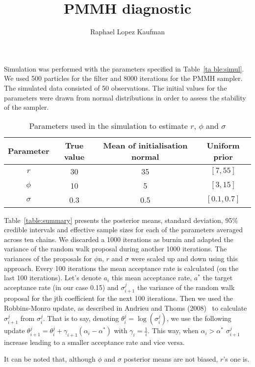 \documentclass{article}
\title{PMMH diagnostic}
\author{Raphael Lopez Kaufman}
\date{}
\begin{document}
Simulation was performed with the parameters specified in Table~\ref{ta ble:simul}. We used 500 particles for the filter and 8000 iterations for the PMMH sampler. The simulated data consisted of 50 observations. The initial values for the parameters were drawn from normal distributions in order to assess the stability of the sampler.

	\begin{table}[htb]
		\centering
		\vspace{5mm}
		\begin{tabular}{c|c|c|c}
			Parameter & True value &  Mean of initialisation normal &  Uniform prior \\ \hline
			$r$ & 30 & 35 & $[7, 55]$\\ \hline
			$\phi$ & 10 & 5 & $[3, 15]$\\ \hline
			$\sigma$ & 0.3 &  0.5 & $[0.1, 0.7]$\\ \hline
		\end{tabular}
		\caption{Parameters used in the simulation to estimate $r$, $\phi$ and $\sigma$}
		\label{table:simul}
		\vspace{5mm}
	\end{table}

Table~\ref{table:summary} presents the posterior means, standard deviation, 95\% credible intervals and effective sample sizes for each of the parameters averaged across ten chains. We discarded a 1000 iterations as burnin and adapted the variance of the random walk proposal during another 1000 iterations. The variances of the proposals for $\phi$n, $r$ and $\sigma$ were scaled up and down using this approach. Every 100 iterations the mean acceptance rate is calculated (on the last 100 iterations). Let's denote $a_{i}$ this mean acceptance rate, $a^*$ the target acceptance rate (in our case 0.15) and $\sigma_{i+1}^j$ the variance of the random walk proposal for the jth coefficient for the next 100 iterations. Then we used the Robbins-Monro update, as described in Andrieu and Thoms (2008)~\cite{Andrieu2008} to calculate $\sigma_{i+1}^j$  from $\sigma_{i}^j$. That is to say, denoting $\theta_i^j = \log(\sigma_i^j)$, we use the following update $\theta_{i+1}^j =  \theta_i^j + \gamma_{i+1}(\alpha_i-\alpha^*)$ with $\gamma_i = \frac{1}{i}$. This way, when $\alpha_i > \alpha^*$ $\sigma_{i+1}^j$ increase leading to a smaller acceptance rate and vice versa.

It can be noted that, although $\phi$ and $\sigma$ posterior means are not biased, $r$'s one is. 
\end{document}
